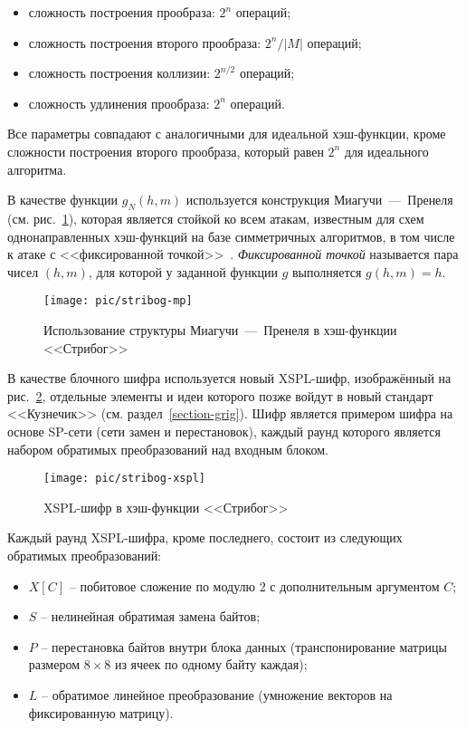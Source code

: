 \begin{itemize}
	\item сложность построения прообраза: $2^n$ операций;
	\item сложность построения второго прообраза: $2^n / \left|M\right|$ операций;
	\item сложность построения коллизии: $2^{n/2}$ операций;
	\item сложность удлинения прообраза: $2^n$ операций.
\end{itemize}

Все параметры совпадают с аналогичными для идеальной хэш-функции, кроме сложности построения второго прообраза, который равен $2^n$ для идеального алгоритма.

В качестве функции $g_N(h, m)$ используется конструкция Миагучи~---~Пренеля (см. рис.~\ref{fig:stribog-mp}), которая является стойкой ко всем атакам, известным для схем однонаправленных хэш-функций на базе симметричных алгоритмов, в том числе к атаке с <<фиксированной точкой>>~\cite[стр. 502]{Schneier:2002}. \emph{Фиксированной точкой} называется пара чисел $(h, m)$, для которой у заданной функции $g$ выполняется $g(h, m) = h$.

\begin{figure}[htb]
	\centering
	\texttt{[image: pic/stribog-mp]}
  \caption{Использование структуры Миагучи~---~Пренеля в хэш-функции <<Стрибог>>}
  \label{fig:stribog-mp}
\end{figure}

В качестве блочного шифра используется новый XSPL-шифр, изображённый на рис.~\ref{fig:stribog-xspl}, отдельные элементы и идеи которого позже войдут в новый стандарт <<Кузнечик>> (см. раздел~\ref{section-grig}). Шифр является примером шифра на основе SP-сети (сети замен и перестановок), каждый раунд которого является набором обратимых преобразований над входным блоком.

\begin{figure}[htb]
	\centering
	\texttt{[image: pic/stribog-xspl]}
  \caption{XSPL-шифр в хэш-функции <<Стрибог>>}
  \label{fig:stribog-xspl}
\end{figure}

Каждый раунд XSPL-шифра, кроме последнего, состоит из следующих обратимых преобразований:
\begin{itemize}
	\item $X\left[C\right]$ -- побитовое сложение по модулю 2 с дополнительным аргументом $C$;
	\item $S$ -- нелинейная обратимая замена байтов;
	\item $P$ -- перестановка байтов внутри блока данных (транспонирование матрицы размером $8 \times 8$ из ячеек по одному байту каждая);
	\item $L$ -- обратимое линейное преобразование (умножение векторов на фиксированную матрицу).
\end{itemize}

